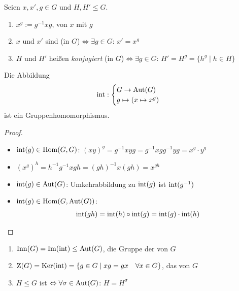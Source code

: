 \begin{definition}[Konjugation]
	Seien $x,x',g\in G$ und $H,H'\le G$.
	\begin{enumerate}[label=(\alph*)]
		\item $x^g:= g^{-1}xg$,  von $x$ mit $g$
		\item $x$ und $x'$ sind  (in $G$)$\Leftrightarrow\exists g\in G$: $x'=x^g$
		\item $H$ und $H'$ heißen \emph{konjugiert} (in $G$)$\Leftrightarrow\exists g\in G$: $H'=H^g=\{h^g\mid h\in H\}$
	\end{enumerate}
\end{definition}

\begin{lemma}
	Die Abbildung
	\begin{align}
		\operatorname{int}:\begin{cases}
			G\to \operatorname{Aut}(G) \\ g\mapsto (x\mapsto x^g)
		\end{cases}\notag
	\end{align}
	ist ein Gruppenhomomorphismus.
\end{lemma}
\begin{proof}
	\begin{itemize}
		\item $\operatorname{int}(g)\in\operatorname{Hom}(G,G)$: $(xy)^g=g^{-1}xyg=g^{-1}xgg^{-1}yg=x^g\cdot y^g$
		\item $(x^g)^h=h^{-1}g^{-1}xgh=(gh)^{-1}x(gh)=x^{gh}$
		\item $\operatorname{int}(g)\in\operatorname{Aut}(G)$: Umkehrabbildung zu $\operatorname{int}(g)$ ist $\operatorname{int}(g^{-1})$
		\item $\operatorname{int}(g)\in\operatorname{Hom}(G,\operatorname{Aut}(G))$:
		\begin{align}
			\operatorname{int}(gh)=\operatorname{int}(h)\circ\operatorname{int}(g)=\operatorname{int}(g)\cdot\operatorname{int}(h)\notag
		\end{align}
	\end{itemize}
\end{proof}

\begin{definition}
	\begin{enumerate}[label=(\alph*)]
		\item $\operatorname{Inn}(G)=\operatorname{Im}(\operatorname{int})\le\operatorname{Aut}(G)$, die Gruppe der  von $G$
		\item $\operatorname{Z}(G)=\operatorname{Ker}(\operatorname{int})=\{g\in G\mid xg=gx\quad\forall x\in G\}$, das  von $G$
		\item $H\le G$ ist  $\Leftrightarrow\forall\sigma\in\operatorname{Aut}(G)$: $H=H^\sigma$
	\end{enumerate}
\end{definition}

